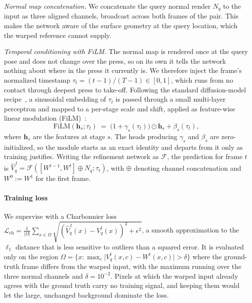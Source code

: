 \emph{Normal map concatenation.} We concatenate the query normal render $N_q$ to the input as three
aligned channels, broadcast across both frames of the pair. This makes the network aware of the
surface geometry at the query location, which the warped reference cannot supply.

\emph{Temporal conditioning with FiLM.} The normal map is rendered once at the query pose and does
not change over the press, so on its own it tells the network nothing about where in the press it
currently is. We therefore inject the frame's normalized timestamp $\tau_t = (t-1)/(T-1) \in
[0,1]$, which runs from no contact through deepest press to take-off. Following the standard
diffusion-model recipe~\cite{ldm}, a sinusoidal embedding of $\tau_t$ is passed through a small
multi-layer perceptron and mapped to a per-stage scale and shift, applied as feature-wise linear
modulation (FiLM)~\cite{film}:
\begin{equation}
  \mathrm{FiLM}(\mathbf{h}_s; \tau_t) \;=\;
  \bigl(1 + \gamma_s(\tau_t)\bigr) \odot \mathbf{h}_s + \beta_s(\tau_t),
\end{equation}
where $\mathbf{h}_s$ are the features at stage $s$. The heads producing $\gamma_s$ and $\beta_s$
are zero-initialized, so the module starts as an exact identity and departs from it only as
training justifies. Writing the refinement network as $\mathcal{F}$, the prediction for frame $t$
is $\hat{V}_q^{\,t} = \mathcal{F}( [ W^{t-1}, W^{t} ] \oplus N_q ; \tau_t )$, with $\oplus$
denoting channel concatenation and $W^{0} := W^{1}$ for the first frame.

\paragraph{Training loss}
We supervise with a Charbonnier loss $\mathcal{L}_{\mathrm{ch}} = \frac{1}{|\Omega|}\sum_{x \in
\Omega} \sqrt{(\hat{V}_q^{\,t}(x) - V_q^{t}(x))^2 + \epsilon^2}$, a smooth approximation to the
$\ell_1$ distance that is less sensitive to outliers than a squared error. It is evaluated only on
the region $\Omega = \{ x : \max_{c} \lvert V_q^{t}(x, c) - W^{t}(x, c) \rvert > \delta \}$ where
the ground-truth frame differs from the warped input, with the maximum running over the three
normal channels and $\delta = 10^{-2}$. Pixels at which the warped input already agrees with the
ground truth carry no training signal, and keeping them would let the large, unchanged background
dominate the loss.
